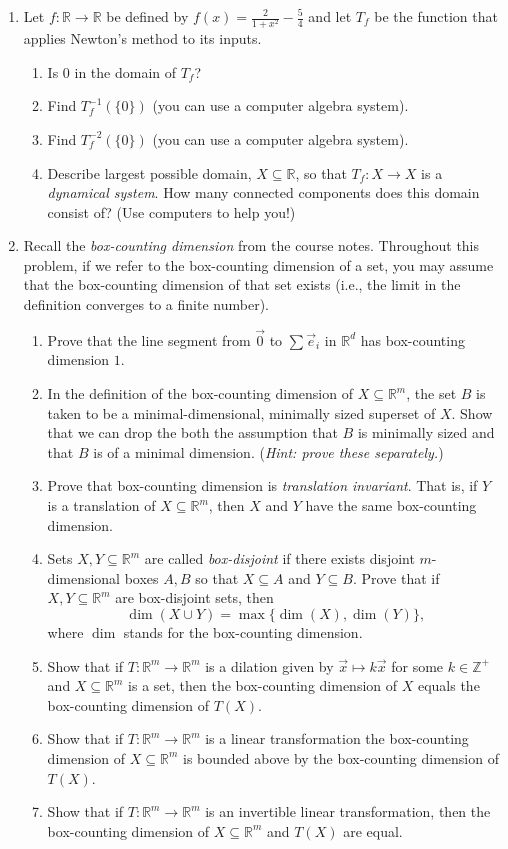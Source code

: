 \documentclass[letter]{article}
\newcommand{\R}{\mathbb{R}}
\newcommand{\Z}{\mathbb{Z}}
\begin{document}
\begin{enumerate}
		\item Let $f:\R\to\R$ be defined by $f(x)=\frac{2}{1+x^2}-\frac{5}{4}$ and let $T_f$ be the function that applies Newton's method
			to its inputs.
			\begin{enumerate}
				\item Is $0$ in the domain of $T_f$?
				\item Find $T_f^{-1}(\{0\})$ (you can use a computer algebra system).
				\item Find $T_f^{-2}(\{0\})$ (you can use a computer algebra system).
				\item Describe largest possible domain, $X\subseteq \R$, so that $T_f:X\to X$ is a \emph{dynamical
					system}. How many connected components does this domain consist of? (Use computers to help you!)
			\end{enumerate}

		\item Recall the \emph{box-counting dimension} from the course notes. Throughout this problem, if we
			refer to the box-counting dimension of a set, you may assume that the box-counting dimension of that
			set exists (i.e., the limit in the definition converges to a finite number).
			\begin{enumerate}
				\item Prove that the line segment from $\vec 0$ to $\sum \vec e_i$ in $\R^d$ has box-counting dimension $1$.
				\item In the definition of the box-counting dimension of $X\subseteq \R^m$, 
					the set $B$ is taken to be a minimal-dimensional, minimally
					sized superset of $X$. Show that we can drop the both the
					assumption that $B$ is minimally sized and that $B$ is of a minimal dimension. (\emph{Hint: 
					prove these separately.})
				\item Prove that box-counting dimension is \emph{translation invariant}. That is, if $Y$ is
					a translation of $X\subseteq\R^m$, then $X$ and $Y$ have the same box-counting dimension.
				\item Sets $X,Y\subseteq \R^m$ are called \emph{box-disjoint} if there exists disjoint $m$-dimensional
					boxes $A,B$ so that $X\subseteq A$ and $Y\subseteq B$.
					Prove that if $X,Y\subseteq \R^m$ are box-disjoint sets, then 
					\[
						\dim(X\cup Y) = \max\{\dim(X),\dim(Y)\},
					\]
					where $\dim$ stands for the box-counting dimension.
				\item Show that
					if $T:\R^m\to\R^m$ is a dilation given by $\vec x\mapsto k\vec x$ for some $k\in\Z^+$ 
					and $X\subseteq \R^m$ is a set, then
					the box-counting dimension of $X$ equals the box-counting dimension of $T(X)$.
				\item Show that if $T:\R^m\to\R^m$ is a linear transformation the box-counting dimension of
					$X\subseteq \R^m$ is bounded above by the box-counting dimension of $T(X)$.
				\item Show that if $T:\R^m\to\R^m$ is an invertible linear transformation, then the box-counting
					dimension of $X\subseteq\R^m$ and $T(X)$ are equal.
			\end{enumerate}


	\end{enumerate}
\end{document}
